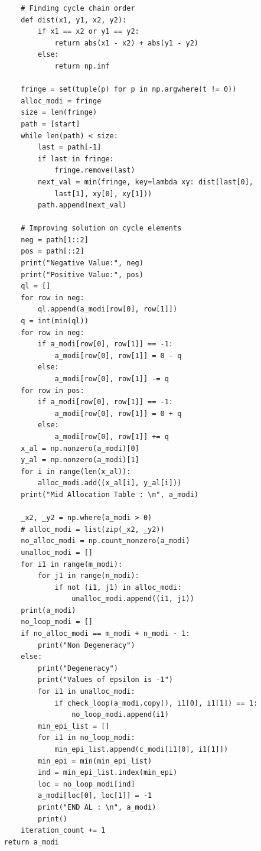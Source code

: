 \documentclass[12pt, letterpaper, twoside]{book}
\begin{document}
\begin{lstlisting}
		# Finding cycle chain order
		def dist(x1, y1, x2, y2):
			if x1 == x2 or y1 == y2:
				return abs(x1 - x2) + abs(y1 - y2)
			else:
				return np.inf
				
		fringe = set(tuple(p) for p in np.argwhere(t != 0))
		alloc_modi = fringe
		size = len(fringe)
		path = [start]
		while len(path) < size:
			last = path[-1]
			if last in fringe:
				fringe.remove(last)
			next_val = min(fringe, key=lambda xy: dist(last[0], 
				last[1], xy[0], xy[1]))
			path.append(next_val)
			
		# Improving solution on cycle elements
		neg = path[1::2]
		pos = path[::2]
		print("Negative Value:", neg)
		print("Positive Value:", pos)
		ql = []
		for row in neg:
			ql.append(a_modi[row[0], row[1]])
		q = int(min(ql))
		for row in neg:
			if a_modi[row[0], row[1]] == -1:
				a_modi[row[0], row[1]] = 0 - q
			else:
				a_modi[row[0], row[1]] -= q
		for row in pos:
			if a_modi[row[0], row[1]] == -1:
				a_modi[row[0], row[1]] = 0 + q
			else:
				a_modi[row[0], row[1]] += q
		x_al = np.nonzero(a_modi)[0]
		y_al = np.nonzero(a_modi)[1]
		for i in range(len(x_al)):
			alloc_modi.add((x_al[i], y_al[i]))
		print("Mid Allocation Table : \n", a_modi)
		
		_x2, _y2 = np.where(a_modi > 0)
		# alloc_modi = list(zip(_x2, _y2))
		no_alloc_modi = np.count_nonzero(a_modi)
		unalloc_modi = []
		for i1 in range(m_modi):
			for j1 in range(n_modi):
				if not (i1, j1) in alloc_modi:
					unalloc_modi.append((i1, j1))
		print(a_modi)
		no_loop_modi = []
		if no_alloc_modi == m_modi + n_modi - 1:
			print("Non Degeneracy")
		else:
			print("Degeneracy")
			print("Values of epsilon is -1")
			for i1 in unalloc_modi:
				if check_loop(a_modi.copy(), i1[0], i1[1]) == 1:
					no_loop_modi.append(i1)
			min_epi_list = []
			for i1 in no_loop_modi:
				min_epi_list.append(c_modi[i1[0], i1[1]])
			min_epi = min(min_epi_list)
			ind = min_epi_list.index(min_epi)
			loc = no_loop_modi[ind]
			a_modi[loc[0], loc[1]] = -1
			print("END AL : \n", a_modi)
			print()
		iteration_count += 1
	return a_modi



\end{lstlisting}
\end{document}
